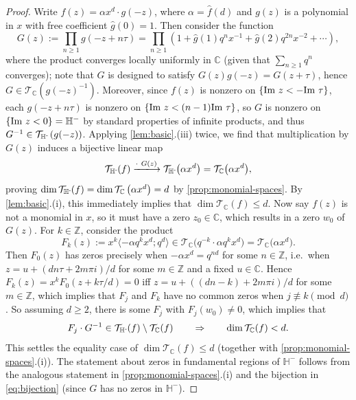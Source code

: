 \documentclass[reqno,11pt]{amsart}
\theoremstyle{definition}
\theoremstyle{remark}
\numberwithin{equation}{section}
\newcommand{\Z}{\mathbb{Z}}
\newcommand{\C}{\mathbb{C}}
\renewcommand{\H}{{\mathbb{H}}}
\newcommand{\Hminus}{{\mathbb{H}^{\textnormal{-}\hspace{-0.03cm}}}}
\newcommand{\mT}{\mathcal{T}}
\renewcommand{\Im}{\textnormal{Im}\ }
\renewcommand{\hat}{\widehat}
\begin{document}
\begin{proof}
Write $f(z) = \alpha x^d \cdot g(-z)$, where $\alpha = \hat{f}(d)$ and $g(z)$ is a polynomial in $x$ with free coefficient $\hat{g}(0) = 1$. Then consider the function
\[
    G(z) := \prod_{n \ge 1} g(-z + n\tau) = \prod_{n \ge 1} \left(1 + \hat{g}(1) q^nx^{-1} + \hat{g}(2) q^{2n}x^{-2} + \cdots \right),
\]
where the product converges locally uniformly in $\C$ (given that $\sum_{n \ge 1} q^n$ converges); note that $G$ is designed to satisfy $G(z)g(-z) = G(z+\tau)$, hence $G \in \mT_\C\left(g(-z)^{-1}\right)$. Moreover, since $f(z)$ is nonzero on $\{\Im z < - \Im \tau\}$, each $g(-z+n\tau)$ is nonzero on $\{\Im z < (n-1)\Im \tau\}$, so $G$ is nonzero on $\{\Im z < 0\} = \H^-$ by standard properties of infinite products, and thus $G^{-1} \in \mT_\Hminus\left(g(-z)\right)$. Applying \cref{lem:basic}.(iii) twice, we find that multiplication by $G(z)$ induces a bijective linear map
\begin{equation}\label{eq:bijection}
     \mT_\Hminus (f)
     \xlongrightarrow{\cdot\ G(z)}
     \mT_\Hminus\big(\alpha x^d \big)
     =
     \mT_\C\big(\alpha x^d \big),
\end{equation}
proving $\dim \mT_\Hminus(f) = \dim \mT_\C\left(\alpha x^d\right) = d$ by \cref{prop:monomial-spaces}. By \cref{lem:basic}.(i), this immediately implies that $\dim \mT_\C(f) \le d$. Now say $f(z)$ is not a monomial in $x$, so it must have a zero $z_0 \in \C$, which results in a zero $w_0$ of $G(z)$. For $k \in \Z$, consider the product
\[
    F_k(z) := x^k \big\langle {-\alpha} q^k x^d; q^d \big\rangle \in \mT_\C\big(q^{-k} \cdot \alpha q^k x^d\big) = \mT_\C\big(\alpha x^d\big).
\]
Then $F_0(z)$ has zeros precisely when $-\alpha x^d = q^{nd}$ for some $n \in \Z$, i.e.\ when $z = u + (dn\tau + 2m\pi i)/d$ for some $m \in \Z$ and a fixed $u \in \C$. Hence $F_k(z) = x^k F_0(z + k\tau/d) = 0$ iff $z = u + ((dn-k)+ 2m\pi i)/d$ for some $m \in \Z$, which implies that $F_j$ and $F_k$ have no common zeros when $j \not\equiv k \pmod{d}$. So assuming $d \ge 2$, there is some $F_j$ with $F_j(w_0) \neq 0$, which implies that
\[
    F_j \cdot G^{-1} \in \mT_\Hminus(f) \setminus \mT_\C(f)
    \qquad 
    \Rightarrow 
    \qquad 
    \dim \mT_\C(f) < d.
\]
This settles the equality case of $\dim \mT_\C(f) \le d$ (together with \cref{prop:monomial-spaces}.(i)). The statement about zeros in fundamental regions of $\H^-$ follows from the analogous statement in \cref{prop:monomial-spaces}.(i) and the bijection in \cref{eq:bijection} (since $G$ has no zeros in $\H^-$).
\end{proof}
\end{document}
